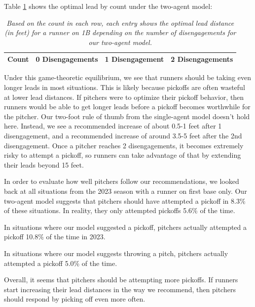 \documentclass{article}
\begin{document}
      Table \ref{tab:count-twoagent} shows the optimal lead by count under the two-agent model:

      \begin{table}
        \centering
        \begin{tabular}{c|ccc}
          Count & 0 Disengagements & 1 Disengagement & 2 Disengagements\\
          \hline
          
        \end{tabular}
        \caption{
          \it Based on the count in each row, each entry shows the optimal lead distance (in feet) for a runner on 1B depending on the number of disengagements for our two-agent model.
        }
        \label{tab:count-twoagent}
      \end{table}

      Under this game-theoretic equilibrium, we see that runners should be taking even longer leads in most situations. This is likely because pickoffs are often wasteful at lower lead distances. If pitchers were to optimize their pickoff behavior, then runners would be able to get longer leads before a pickoff becomes worthwhile for the pitcher. Our two-foot rule of thumb from the single-agent model doesn't hold here. Instead, we see a recommended increase of about 0.5-1 feet after 1 disengagement, and a recommended increase of around 3.5-5 feet after the 2nd disengagement. Once a pitcher reaches 2 disengagements, it becomes extremely risky to attempt a pickoff, so runners can take advantage of that by extending their leads beyond 15 feet.

      In order to evaluate how well pitchers follow our recommendations, we looked back at all situations from the 2023 season with a runner on first base only. Our two-agent model suggests that pitchers should have attempted a pickoff in 8.3\% of these situations. In reality, they only attempted pickoffs 5.6\% of the time.

      In situations where our model suggested a pickoff, pitchers actually attempted a pickoff 10.8\% of the time in 2023.

      In situations where our model suggests throwing a pitch, pitchers actually attempted a pickoff 5.0\% of the time.

      Overall, it seems that pitchers should be attempting more pickoffs. If runners start increasing their lead distances in the way we recommend, then pitchers should respond by picking off even more often.
\end{document}
